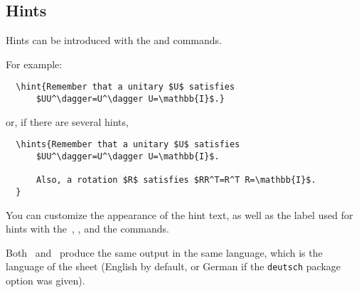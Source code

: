 \documentclass[11pt,a4paper]{article}
\begin{document}


\subsection{Hints}
\label{sec:Hints}

Hints can be introduced with the  and  commands.



For example:
\begin{pkgverbatim}
\begin{verbatim}
  \hint{Remember that a unitary $U$ satisfies
      $UU^\dagger=U^\dagger U=\mathbb{I}$.}
\end{verbatim}
\end{pkgverbatim}
or, if there are several hints,
\begin{pkgverbatim}
\begin{verbatim}
  \hints{Remember that a unitary $U$ satisfies
      $UU^\dagger=U^\dagger U=\mathbb{I}$.

      Also, a rotation $R$ satisfies $RR^T=R^T R=\mathbb{I}$.
  }
\end{verbatim}
\end{pkgverbatim}

\begin{pkgtip}
  You can customize the appearance of the hint text, as well as the label used for hints
  with the~, , and the
   commands.
\end{pkgtip}



\begin{pkgnotice}
  Both~ and~ produce the same output in the same
  language, which is the language of the sheet (English by default, or German if the
  \texttt{deutsch} package option was given).
\end{pkgnotice}
\end{document}
